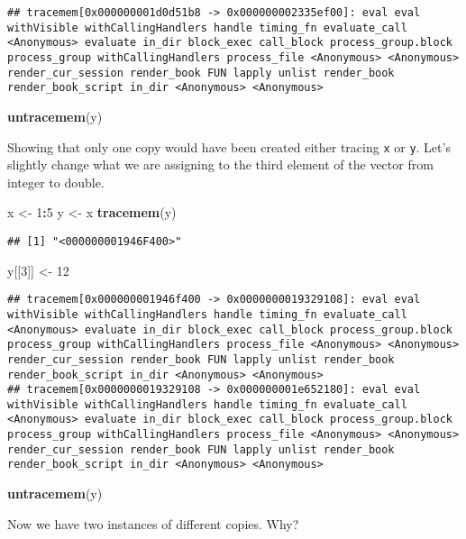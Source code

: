\documentclass[]{book}
\newenvironment{Shaded}{\begin{snugshade}}{\end{snugshade}}
\newcommand{\DecValTok}[1]{\textcolor[rgb]{0.00,0.00,0.81}{#1}}
\newcommand{\KeywordTok}[1]{\textcolor[rgb]{0.13,0.29,0.53}{\textbf{#1}}}
\newcommand{\NormalTok}[1]{#1}
\newcommand{\OperatorTok}[1]{\textcolor[rgb]{0.81,0.36,0.00}{\textbf{#1}}}
\newcommand{\StringTok}[1]{\textcolor[rgb]{0.31,0.60,0.02}{#1}}
\begin{document}
\begin{verbatim}
## tracemem[0x000000001d0d51b8 -> 0x000000002335ef00]: eval eval withVisible withCallingHandlers handle timing_fn evaluate_call <Anonymous> evaluate in_dir block_exec call_block process_group.block process_group withCallingHandlers process_file <Anonymous> <Anonymous> render_cur_session render_book FUN lapply unlist render_book render_book_script in_dir <Anonymous> <Anonymous>
\end{verbatim}

\begin{Shaded}
\begin{Highlighting}[]
\KeywordTok{untracemem}\NormalTok{(y)}
\end{Highlighting}
\end{Shaded}

Showing that only one copy would have been created either tracing \texttt{x} or \texttt{y}. Let's slightly change what we are assigning to the third element of the vector from integer to double.

\begin{Shaded}
\begin{Highlighting}[]
\NormalTok{x <-}\StringTok{ }\DecValTok{1}\OperatorTok{:}\DecValTok{5}
\NormalTok{y <-}\StringTok{ }\NormalTok{x}
\KeywordTok{tracemem}\NormalTok{(y)}
\end{Highlighting}
\end{Shaded}

\begin{verbatim}
## [1] "<000000001946F400>"
\end{verbatim}

\begin{Shaded}
\begin{Highlighting}[]
\NormalTok{y[[}\DecValTok{3}\NormalTok{]] <-}\StringTok{ }\DecValTok{12}
\end{Highlighting}
\end{Shaded}

\begin{verbatim}
## tracemem[0x000000001946f400 -> 0x0000000019329108]: eval eval withVisible withCallingHandlers handle timing_fn evaluate_call <Anonymous> evaluate in_dir block_exec call_block process_group.block process_group withCallingHandlers process_file <Anonymous> <Anonymous> render_cur_session render_book FUN lapply unlist render_book render_book_script in_dir <Anonymous> <Anonymous> 
## tracemem[0x0000000019329108 -> 0x000000001e652180]: eval eval withVisible withCallingHandlers handle timing_fn evaluate_call <Anonymous> evaluate in_dir block_exec call_block process_group.block process_group withCallingHandlers process_file <Anonymous> <Anonymous> render_cur_session render_book FUN lapply unlist render_book render_book_script in_dir <Anonymous> <Anonymous>
\end{verbatim}

\begin{Shaded}
\begin{Highlighting}[]
\KeywordTok{untracemem}\NormalTok{(y)}
\end{Highlighting}
\end{Shaded}

Now we have two instances of different copies. Why?
\end{document}
